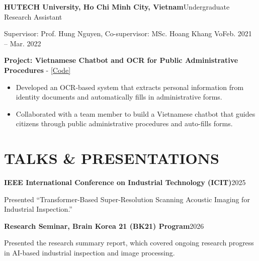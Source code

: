 \documentclass[a4paper,10pt]{extarticle}
\newcommand{\cventry}[2]{\noindent\textbf{#1}\hfill #2\par}
\newcommand{\cvline}[2]{\noindent #1\hfill #2\par}
\newcommand{\entrydetail}[1]{\noindent #1\par}
\newenvironment{cvlist}{\begin{list}{}{%
  \setlength{\leftmargin}{0pt}\setlength{\itemindent}{0pt}%
  \setlength{\parsep}{0pt}\setlength{\itemsep}{4pt}\setlength{\topsep}{4pt}}}%
  {\end{list}}
\begin{document}
\begin{cvlist}
    \item
    \cventry{HUTECH University, Ho Chi Minh City, Vietnam}{Undergraduate Research Assistant}
    \cvline{Supervisor: Prof. Hung Nguyen, Co-supervisor: MSc. Hoang Khang Vo}{Feb. 2021 -- Mar. 2022}
    \begin{enumerate}[label={[\arabic*]}, leftmargin=*]
        \item \textbf{Project: Vietnamese Chatbot and OCR for Public Administrative Procedures} - \href{https://github.com/nhannt69/public-admin-procedure-assistant}{[Code]}
        \begin{itemize}[leftmargin=*]
            \item Developed an OCR-based system that extracts personal information from identity documents and automatically fills in administrative forms.
            \item Collaborated with a team member to build a Vietnamese chatbot that guides citizens through public administrative procedures and auto-fills forms.
        \end{itemize}
    \end{enumerate}
\end{cvlist}

\section*{TALKS \& PRESENTATIONS}
\begin{cvlist}
    \item
    \cventry{IEEE International Conference on Industrial Technology (ICIT)}{2025}
    \entrydetail{Presented ``Transformer-Based Super-Resolution Scanning Acoustic Imaging for Industrial Inspection.''}

    \item
    \cventry{Research Seminar, Brain Korea 21 (BK21) Program}{2026}
    \entrydetail{Presented the research summary report, which covered ongoing research progress in AI-based industrial inspection and image processing.}
\end{cvlist}

\end{document}
